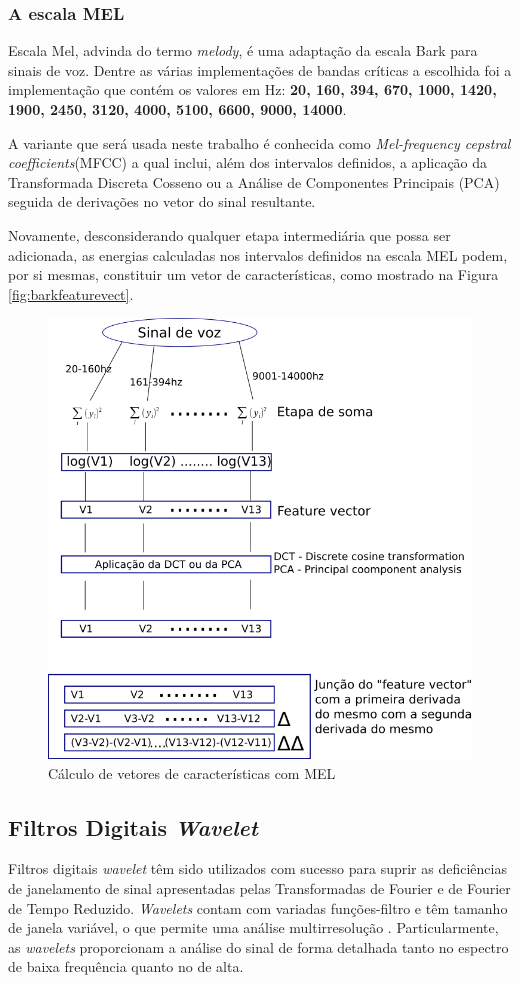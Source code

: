 	\subsubsection{A escala MEL}
		\par Escala Mel, advinda do termo \textit{melody},  é uma adaptação da escala Bark para sinais de voz. Dentre as várias implementações de bandas críticas a escolhida foi a implementação que contém os valores em Hz: \textbf{20, 160, 394, 670, 1000, 1420, 1900, 2450, 3120, 4000, 5100, 6600, 9000, 14000}.
		\par A variante que será usada neste trabalho é conhecida como \textit{Mel-frequency cepstral coefficients}(MFCC) a qual inclui, além dos intervalos definidos, a aplicação da Transformada Discreta Cosseno \cite{salomon2007data} ou a Análise de Componentes Principais (PCA) \cite{jolliffe2006principal} seguida de derivações no vetor do sinal resultante.
		\par Novamente, desconsiderando qualquer etapa intermediária que possa ser adicionada, as energias calculadas nos intervalos definidos na escala MEL podem, por si mesmas, constituir um vetor de características, como mostrado na Figura \ref{fig:barkfeaturevect}.
		\begin{figure}[h]
			\centering
			\includegraphics[width=0.8\linewidth]{images/melFeatureVect}
			\caption{Cálculo de vetores de características com MEL}
			\label{fig:melfeaturevect}
		\end{figure}
	
		\subsection{Filtros Digitais \textit{Wavelet}}
			\par Filtros digitais \textit{wavelet} têm sido utilizados com sucesso para suprir as deficiências de janelamento de sinal apresentadas pelas Transformadas de Fourier e de Fourier de Tempo Reduzido. \textit{Wavelets} contam com variadas funções-filtro e têm tamanho de janela variável, o que permite uma análise multirresolução \cite{Rod5254905}. Particularmente, as \textit{wavelets} proporcionam a análise do sinal de forma detalhada tanto no espectro de baixa frequência quanto no de alta.
			
